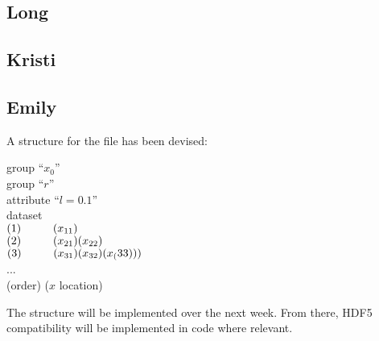 \documentclass[12pt]{article}
\begin{document}
\subsection{Long}
\subsection{Kristi}
\subsection{Emily}
A structure for the file has been devised:
\begin{tabbing}
	\hspace{5mm} group ``$x_{0}$'' \\
		\hspace{10mm} group ``$r$'' \\
			\hspace{15mm} attribute ``$l=0.1$'' \\
				\hspace{20mm} dataset \\
					\hspace{25mm} $(1) \hspace{10mm} (x_{11})$ \\
					\hspace{25mm} $(2) \hspace{10mm} (x_{21})(x_{22})$ \\
					\hspace{25mm} $(3) \hspace{10mm} (x_{31})(x_{32})(x_(33)))$ \\
					\hspace{25mm} ... \\
					\hspace{25mm} (order) ($x$ location) \\	
\end{tabbing}
The structure will be implemented over the next week. From there, HDF5 compatibility will be implemented in code where relevant.




\end{document}
